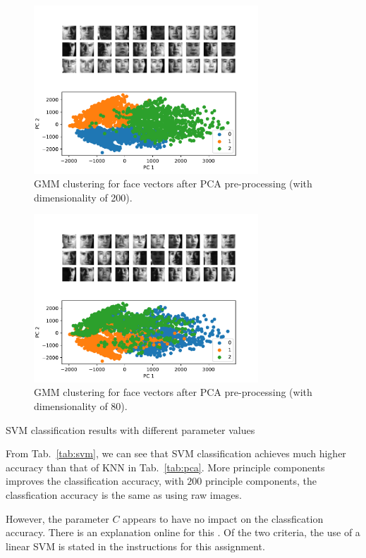 \documentclass[a4paper]{exam}
\begin{document}
\begin{questions}
    \begin{figure}[h]
        \centering
        \includegraphics[width=0.75\textwidth]{gmm_200}
        \caption{GMM clustering for face vectors after PCA pre-processing (with dimensionality of 200).}
        \label{fig:gmm_200}
    \end{figure}

    \begin{figure}[h]
        \centering
        \includegraphics[width=0.75\textwidth]{gmm_80}
        \caption{GMM clustering for face vectors after PCA pre-processing (with dimensionality of 80).}
        \label{fig:gmm_80}
    \end{figure}
    \clearpage\question SVM classification results with different parameter values

    From Tab.~\ref{tab:svm}, we can see that SVM classification achieves much higher accuracy than that of KNN in Tab.~\ref{tab:pca}.
    More principle components improves the classification accuracy, with $200$ principle components, the classfication accuracy is the same as using raw images.

    However, the parameter $C$ appears to have no impact on the classfication accuracy.
    There is an explanation online for this \cite{238209}.
    Of the two criteria, the use of a linear SVM is stated in the instructions for this assignment.


\end{questions}
\end{document}
